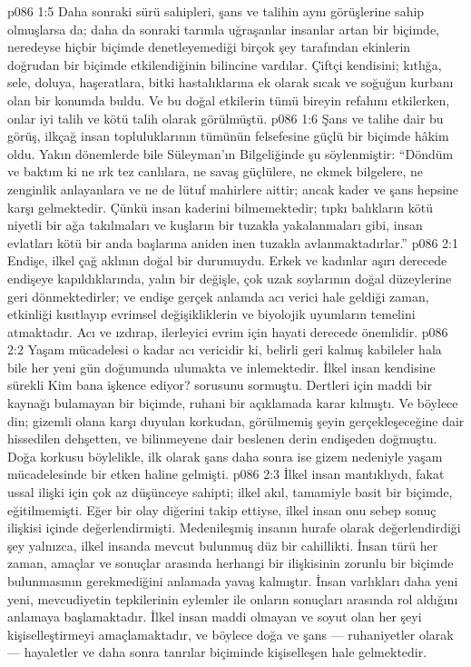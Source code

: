 \vs p086 1:5 Daha sonraki sürü sahipleri, şans ve talihin aynı görüşlerine sahip olmuşlarsa da; daha da sonraki tarımla uğraşanlar insanlar artan bir biçimde, neredeyse hiçbir biçimde denetleyemediği birçok şey tarafından ekinlerin doğrudan bir biçimde etkilendiğinin bilincine vardılar. Çiftçi kendisini; kıtlığa, sele, doluya, haşeratlara, bitki hastalıklarına ek olarak sıcak ve soğuğun kurbanı olan bir konumda buldu. Ve bu doğal etkilerin tümü bireyin refahını etkilerken, onlar iyi talih ve kötü talih olarak görülmüştü.
\vs p086 1:6 Şans ve talihe dair bu görüş, ilkçağ insan topluluklarının tümünün felsefesine güçlü bir biçimde hâkim oldu. Yakın dönemlerde bile Süleyman’ın Bilgeliğinde şu söylenmiştir: “Döndüm ve baktım ki ne ırk tez canlılara, ne savaş güçlülere, ne ekmek bilgelere, ne zenginlik anlayanlara ve ne de lütuf mahirlere aittir; ancak kader ve şans hepsine karşı gelmektedir. Çünkü insan kaderini bilmemektedir; tıpkı balıkların kötü niyetli bir ağa takılmaları ve kuşların bir tuzakla yakalanmaları gibi, insan evlatları kötü bir anda başlarına aniden inen tuzakla avlanmaktadırlar.”
\vs p086 2:1 Endişe, ilkel çağ aklının doğal bir durumuydu. Erkek ve kadınlar aşırı derecede endişeye kapıldıklarında, yalın bir değişle, çok uzak soylarının doğal düzeylerine geri dönmektedirler; ve endişe gerçek anlamda acı verici hale geldiği zaman, etkinliği kısıtlayıp evrimsel değişikliklerin ve biyolojik uyumların temelini atmaktadır. Acı ve ızdırap, ilerleyici evrim için hayati derecede önemlidir.
\vs p086 2:2 Yaşam mücadelesi o kadar acı vericidir ki, belirli geri kalmış kabileler hala bile her yeni gün doğumunda ulumakta ve inlemektedir. İlkel insan kendisine sürekli Kim bana işkence ediyor? sorusunu sormuştu. Dertleri için maddi bir kaynağı bulamayan bir biçimde, ruhani bir açıklamada karar kılmıştı. Ve böylece din; gizemli olana karşı duyulan korkudan, görülmemiş şeyin gerçekleşeceğine dair hissedilen dehşetten, ve bilinmeyene dair beslenen derin endişeden doğmuştu. Doğa korkusu böylelikle, ilk olarak şans daha sonra ise gizem nedeniyle yaşam mücadelesinde bir etken haline gelmişti.
\vs p086 2:3 İlkel insan mantıklıydı, fakat ussal ilişki için çok az düşünceye sahipti; ilkel akıl, tamamiyle basit bir biçimde, eğitilmemişti. Eğer bir olay diğerini takip ettiyse, ilkel insan onu sebep sonuç ilişkisi içinde değerlendirmişti. Medenileşmiş insanın hurafe olarak değerlendirdiği şey yalnızca, ilkel insanda mevcut bulunmuş düz bir cahillikti. İnsan türü her zaman, amaçlar ve sonuçlar arasında herhangi bir ilişkisinin zorunlu bir biçimde bulunmasının gerekmediğini anlamada yavaş kalmıştır. İnsan varlıkları daha yeni yeni, mevcudiyetin tepkilerinin eylemler ile onların sonuçları arasında rol aldığını anlamaya başlamaktadır. İlkel insan maddi olmayan ve soyut olan her şeyi kişiselleştirmeyi amaçlamaktadır, ve böylece doğa ve şans --- ruhaniyetler olarak --- hayaletler ve daha sonra tanrılar biçiminde kişiselleşen hale gelmektedir.
